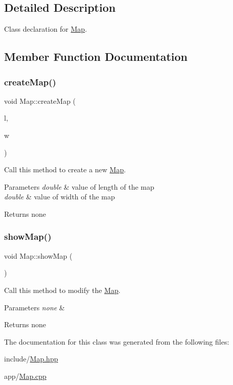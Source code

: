 \subsection{Detailed Description}
Class declaration for \mbox{\hyperlink{class_map}{Map}}. 

\subsection{Member Function Documentation}
\mbox{\label{class_map_ac10743acc7daf1dd4cc3746fca767554}} 
\subsubsection{\texorpdfstring{create\+Map()}{createMap()}}
{\footnotesize\ttfamily void Map\+::create\+Map (\begin{DoxyParamCaption}\item[{double}]{l,  }\item[{double}]{w }\end{DoxyParamCaption})}



Call this method to create a new \mbox{\hyperlink{class_map}{Map}}. 


\begin{DoxyParams}{Parameters}
{\em double} & value of length of the map \\
\hline
{\em double} & value of width of the map\\
\hline
\end{DoxyParams}
\begin{DoxyReturn}{Returns}
none 
\end{DoxyReturn}
\mbox{\label{class_map_a36679bcc048d59f8e2b8ccc81598200c}} 
\subsubsection{\texorpdfstring{show\+Map()}{showMap()}}
{\footnotesize\ttfamily void Map\+::show\+Map (\begin{DoxyParamCaption}{ }\end{DoxyParamCaption})}



Call this method to modify the \mbox{\hyperlink{class_map}{Map}}. 


\begin{DoxyParams}{Parameters}
{\em none} & \\
\hline
\end{DoxyParams}
\begin{DoxyReturn}{Returns}
none 
\end{DoxyReturn}


The documentation for this class was generated from the following files\+:\begin{DoxyCompactItemize}
\item 
include/\mbox{\hyperlink{_map_8hpp}{Map.\+hpp}}\item 
app/\mbox{\hyperlink{_map_8cpp}{Map.\+cpp}}\end{DoxyCompactItemize}
